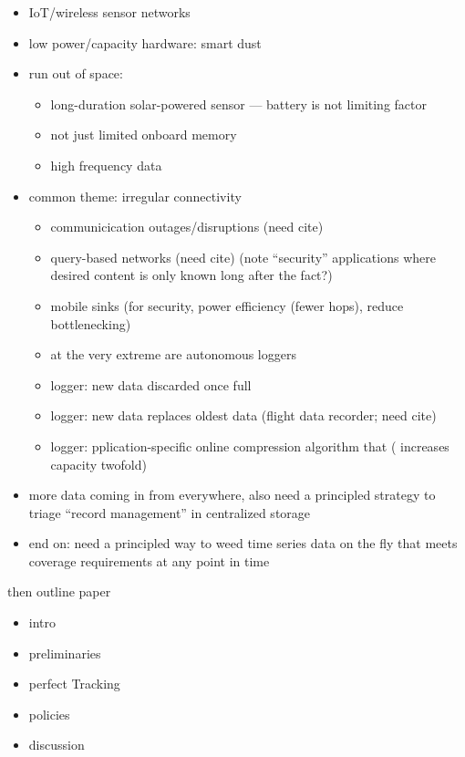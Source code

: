 \begin{itemize}
  \item IoT/wireless sensor networks
  \item low power/capacity hardware: smart dust \citep{warneke2001smart}
  \item run out of space:
  \begin{itemize}
    \item long-duration solar-powered sensor --- battery is not limiting factor \citep{corke2007long}
    \item not just limited onboard memory
    \item high frequency data \citep{luharuka2003design}
  \end{itemize}
  \item common theme: irregular connectivity
  \begin{itemize}
    \item communicication outages/disruptions (need cite)
    \item query-based networks (need cite) (note ``security'' applications where desired content is only known long after the fact?)
    \item mobile sinks \citep{jain2022survey} (for security, power efficiency (fewer hops), reduce bottlenecking)
    \item at the very extreme are autonomous loggers
    \item logger: new data discarded once full \citep{saunders1989portable,mahzan2017design}
    \item logger: new data replaces oldest data (flight data recorder; need cite)
    \item logger: pplication-specific online compression algorithm that (\citep{hadiatna2016design} increases capacity twofold)
  \end{itemize}
  \item more data coming in from everywhere, also need a principled strategy to triage ``record management'' in centralized storage
  \item end on: need a principled way to weed time series data on the fly that meets coverage requirements at any point in time
\end{itemize}



then outline paper
\begin{itemize}
\item intro
\item preliminaries
\item perfect Tracking
\item policies
\item discussion
\end{itemize}
